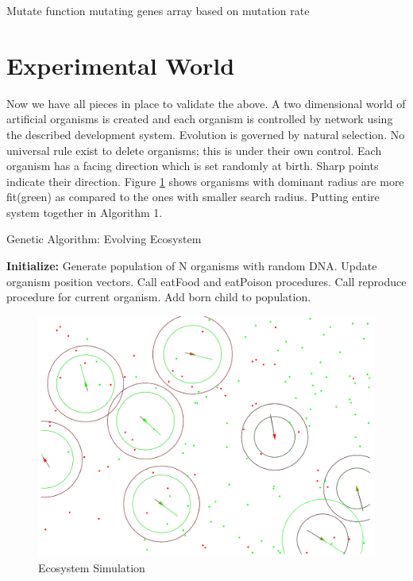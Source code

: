\documentclass[conference]{IEEEtran}
\begin{document}
\begin{algorithm}
\caption{Mutate function mutating genes array based on mutation rate}
\begin{algorithmic} 
\ELSE
{}
\ENDIF
\ENDIF
\ENDFOR
\end{algorithmic}
\end{algorithm}

\section{Experimental World}
Now we have all pieces in place to validate the above. A two dimensional world of artificial organisms is created and each organism is controlled by network using the described development system. Evolution is governed by natural selection. No universal rule exist to delete organisms; this is under their own control. Each organism has a facing direction which is set randomly at birth. Sharp points indicate their direction. Figure \ref{fig:ecosystem} shows organisms with dominant radius are more fit(green) as compared to the ones with smaller search radius. Putting entire system together in Algorithm 1.
\begin{algorithm}
\caption{Genetic Algorithm: Evolving Ecosystem}
\begin{algorithmic} 
\STATE \textbf{Initialize:} Generate population of N organisms with random DNA.
\LOOP
{}                    
\STATE Update organism position vectors.
\STATE Call eatFood and eatPoison procedures.
\STATE Call reproduce procedure for current organism.
\STATE Add born child to population.
\ENDIF
\ENDFOR
\ENDLOOP
\end{algorithmic}
\end{algorithm}
\begin{figure}
	\includegraphics[scale=0.329]{ecosystem.png}
	\caption{Ecosystem Simulation}
	\label{fig:ecosystem}
\end{figure}
\end{document}
